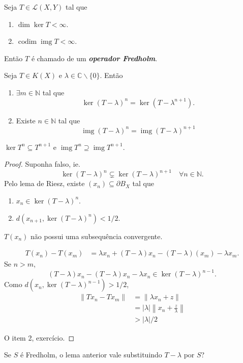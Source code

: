 \documentclass[portuguese]{article}
\theoremstyle{definition}
\newcommand{\N}{\mathbb{N}}
\newcommand{\C}{\mathbb{C}}
\DeclareMathOperator{\img}{img}
\begin{document}
\begin{defn}
	Seja $T\in \mathcal{L}(X,Y)$ tal que
	\begin{enumerate}
		\item $\dim \ker T<\infty$.
		\item $\operatorname{codim}\img T<\infty$.
	\end{enumerate}
	Então $T$ é chamado de um \textbf{\textit{operador Fredholm}}. 
\end{defn}
\begin{lema}
	Seja $T\in K(X)$ e $\lambda\in\C\backslash\{0\}$. Então
	\begin{enumerate}
		\item $\exists m\in\N$ tal que 
		\[\ker(T-\lambda)^n=\ker(T-\lambda^{n+1}).\]
		\item Existe $n\in \N$ tal que
		\[\img(T-\lambda)^n=\img(T-\lambda)^{n+1}\]
	\end{enumerate}
\end{lema}
\begin{obs}
	$\ker T^n\subseteq T^{n+1}$ e $\img T^n\supseteq \img T^{n+1}$.
\end{obs}
\begin{proof}
	Suponha falso, ie.
	\[\ker(T-\lambda)^n\subsetneq\ker(T-\lambda)^{n+1}\quad\forall n\in\N.\]
	Pelo lema de Riesz, existe $(x_n)\subseteq\partial B_X$ tal que
	\begin{enumerate}
		\item  $x_n\in \ker(T-\lambda)^n$.
		\item $d(x_{n+1},\ker(T-\lambda)^n)<1/2$.
	\end{enumerate}
	\begin{af*}
		$T(x_n)$ não possui uma subsequência convergente.
	\end{af*}
	\begin{align*}
		T(x_n)-T(x_m)&=\lambda x_n+(T-\lambda)x_n-(T-\lambda)(x_m)-\lambda x_m.
	\end{align*}
	Se $n>m$,
	\[(T-\lambda)x_n-(T-\lambda)x_n-\lambda x_n\in\ker(T-\lambda)^{n-1}.\]
	Como $d(x_n,\ker(T-\lambda)^{n-1})>1/2$,
	\begin{align*}
		\|Tx_n-Tx_m\|&=\|\lambda x_n+z\|\\
		&=|\lambda|\left\|x_n+\frac{z}{\lambda}\right\|\\
		&>|\lambda|/2
	\end{align*}
	
	{\color{orange} O item 2, exercício.}
\end{proof}
\begin{exer*}
	Se $S$ é Fredholm, o lema anterior vale substituindo $T-\lambda$ por $S$?
\end{exer*}
\end{document}
